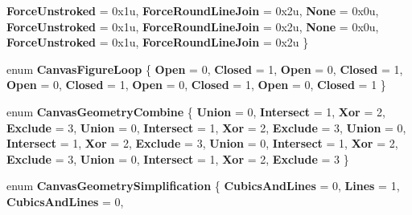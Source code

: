 \begin{DoxyCompactItemize}
{\bfseries Force\+Unstroked} = 0x1u, 
\newline
{\bfseries Force\+Round\+Line\+Join} = 0x2u, 
{\bfseries None} = 0x0u, 
{\bfseries Force\+Unstroked} = 0x1u, 
{\bfseries Force\+Round\+Line\+Join} = 0x2u, 
\newline
{\bfseries None} = 0x0u, 
{\bfseries Force\+Unstroked} = 0x1u, 
{\bfseries Force\+Round\+Line\+Join} = 0x2u
 \}
\item 
\mbox{\label{namespace_microsoft_1_1_graphics_1_1_canvas_1_1_geometry_a28bf1d65eb419d2a2015efc91bb9741c}} 
enum {\bfseries Canvas\+Figure\+Loop} \{ \newline
{\bfseries Open} = 0, 
{\bfseries Closed} = 1, 
{\bfseries Open} = 0, 
{\bfseries Closed} = 1, 
\newline
{\bfseries Open} = 0, 
{\bfseries Closed} = 1, 
{\bfseries Open} = 0, 
{\bfseries Closed} = 1, 
\newline
{\bfseries Open} = 0, 
{\bfseries Closed} = 1
 \}
\item 
\mbox{\label{namespace_microsoft_1_1_graphics_1_1_canvas_1_1_geometry_a8aee93f6169d213f64028a369522c8bb}} 
enum {\bfseries Canvas\+Geometry\+Combine} \{ \newline
{\bfseries Union} = 0, 
{\bfseries Intersect} = 1, 
{\bfseries Xor} = 2, 
{\bfseries Exclude} = 3, 
\newline
{\bfseries Union} = 0, 
{\bfseries Intersect} = 1, 
{\bfseries Xor} = 2, 
{\bfseries Exclude} = 3, 
\newline
{\bfseries Union} = 0, 
{\bfseries Intersect} = 1, 
{\bfseries Xor} = 2, 
{\bfseries Exclude} = 3, 
\newline
{\bfseries Union} = 0, 
{\bfseries Intersect} = 1, 
{\bfseries Xor} = 2, 
{\bfseries Exclude} = 3, 
\newline
{\bfseries Union} = 0, 
{\bfseries Intersect} = 1, 
{\bfseries Xor} = 2, 
{\bfseries Exclude} = 3
 \}
\item 
\mbox{\label{namespace_microsoft_1_1_graphics_1_1_canvas_1_1_geometry_a2ce59b66d6d8d5be54c22ba03d885c82}} 
enum {\bfseries Canvas\+Geometry\+Simplification} \{ \newline
{\bfseries Cubics\+And\+Lines} = 0, 
{\bfseries Lines} = 1, 
{\bfseries Cubics\+And\+Lines} = 0, 

\end{DoxyCompactItemize}
